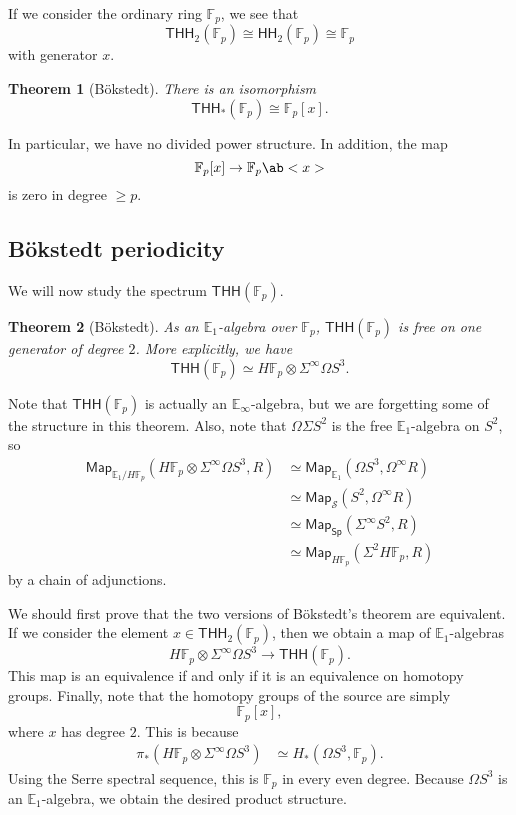 \documentclass[10pt, oneside]{memoir}
\newtheorem{thm}{Theorem}[subsection]
\theoremstyle{definition}
\theoremstyle{remark}
\theoremstyle{plain}
\theoremstyle{definition}
\theoremstyle{remark}
\newcommand{\E}{\mathbb{E}}
\newcommand{\F}{\mathbb{F}}
\newcommand{\mc}[1]{\mathcal{#1}}
\newcommand{\ms}[1]{\mathsf{#1}}
\newcommand{\1}{\mathbf{1}}
\newcommand{\2}{\mathbf{2}}
\newcommand{\3}{\mathbf{3}}
\newcommand{\THH}{\ms{THH}}
\newcommand{\HH}{\ms{HH}}
\begin{document}
If we consider the ordinary ring $\F_p$, we see that 
\[ \THH_2(\F_p) \cong \HH_2(\F_p) \cong \F_p \]
with generator $x$.

\begin{thm}[B\"okstedt]\label{thm:bokstedt}
    There is an isomorphism
    \[ \THH_*(\F_p) \cong \F_p[x]. \]
\end{thm}

In particular, we have no divided power structure. In addition, the map
\[ \F_p[x] \to \F_p \ab<x> \]
is zero in degree $\geq p$.

\subsection{B\"okstedt periodicity}%

We will now study the spectrum $\THH(\F_p)$.

\begin{thm}[B\"okstedt]
    As an $\E_1$-algebra over $\F_p$, $\THH(\F_p)$ is free on one generator of degree $2$. More explicitly, we have
    \[ \THH(\F_p) \simeq H \F_p \otimes \Sigma^{\infty} \Omega S^3. \]
\end{thm}

Note that $\THH(\F_p)$ is actually an $\E_{\infty}$-algebra, but we are forgetting some of the structure in this theorem. Also, note that $\Omega \Sigma S^2$ is the free $\E_1$-algebra on $S^2$, so
\begin{align*}
    \ms{Map}_{\E_1/H\F_p} (H \F_p \otimes \Sigma^{\infty}\Omega S^3, R) &\simeq \ms{Map}_{\E_1} (\Omega S^3, \Omega^{\infty}R) \\
    &\simeq \ms{Map}_{\mc{S}}(S^2, \Omega^{\infty} R) \\
    &\simeq \ms{Map}_{\ms{Sp}}(\Sigma^{\infty}S^2, R) \\
    &\simeq \ms{Map}_{H\F_p} (\Sigma^2 H\F_p, R)
\end{align*}
by a chain of adjunctions.

We should first prove that the two versions of B\"okstedt's theorem are equivalent. If we consider the element $x \in \THH_2(\F_p)$, then we obtain a map of $\E_1$-algebras
\[ H \F_p \otimes \Sigma^{\infty} \Omega S^3 \to \THH(\F_p). \]
This map is an equivalence if and only if it is an equivalence on homotopy groups. Finally, note that the homotopy groups of the source are simply
\[ \F_p [x], \]
where $x$ has degree $2$. This is because
\begin{align*}
    \pi_* (H \F_p \otimes \Sigma^{\infty} \Omega S^3) &\simeq H_* (\Omega S^3, \F_p).
\end{align*}
Using the Serre spectral sequence, this is $\F_p$ in every even degree. Because $\Omega S^3$ is an $\E_1$-algebra, we obtain the desired product structure.
\end{document}
